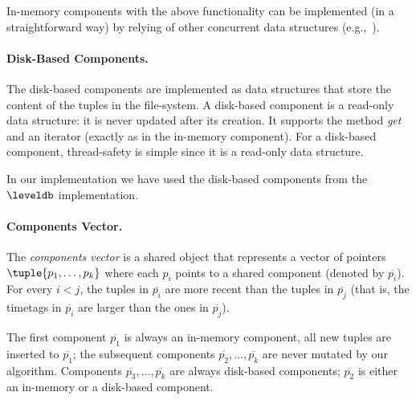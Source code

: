In-memory components with the above functionality can be implemented
(in a straightforward way) by relying of other concurrent data structures (e.g.,~\cite{xxxx,xxxx}).

\paragraph{Disk-Based Components.}
The disk-based components are implemented as data structures that store the content of the tuples in the file-system.
A disk-based component is a read-only data structure: it is never updated after its creation.
It supports the method \emph{get} and an iterator (exactly as in the in-memory component).
For a disk-based component, thread-safety is simple since it is a read-only data structure.

In our implementation we have used the disk-based components  from the $\leveldb$ implementation.


\paragraph{Components Vector.}
The \emph{components vector} is a shared object that represents a vector of pointers $\tuple{p_1,\ldots,p_k}$
where each $p_i$ points to a shared component (denoted by $\overline{p_i}$).
%
For every $i < j$, the tuples in $\overline{p_i}$ are more recent than the tuples in $\overline{p_j}$
(that is, the timetags in $\overline{p_i}$ are larger than the ones in $\overline{p_j}$).


The first component $\overline{p_1}$ is always an in-memory component, all new tuples are inserted to $\overline{p_1}$;
the subsequent components $\overline{p_2},\ldots,\overline{p_k}$ are never mutated by our algorithm.
Components $\overline{p_3},\ldots,\overline{p_k}$ are always disk-based components;
$\overline{p_2}$ is either an in-memory or a disk-based component.

